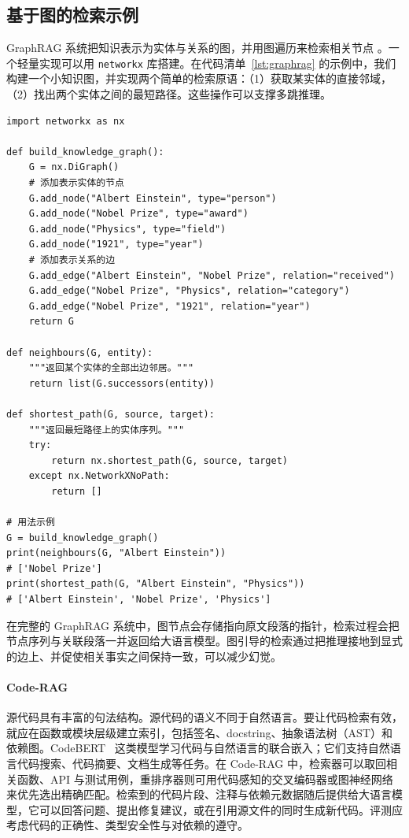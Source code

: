 \subsection{基于图的检索示例}

GraphRAG 系统把知识表示为实体与关系的图，并用图遍历来检索相关节点 \citep{peng2024graphrag_survey}。一个轻量实现可以用 \texttt{networkx} 库搭建。在代码清单~\ref{lst:graphrag} 的示例中，我们构建一个小知识图，并实现两个简单的检索原语：（1）获取某实体的直接邻域，（2）找出两个实体之间的最短路径。这些操作可以支撑多跳推理。

\begin{listing}[!ht]
\begin{verbatim}
import networkx as nx

def build_knowledge_graph():
    G = nx.DiGraph()
    # 添加表示实体的节点
    G.add_node("Albert Einstein", type="person")
    G.add_node("Nobel Prize", type="award")
    G.add_node("Physics", type="field")
    G.add_node("1921", type="year")
    # 添加表示关系的边
    G.add_edge("Albert Einstein", "Nobel Prize", relation="received")
    G.add_edge("Nobel Prize", "Physics", relation="category")
    G.add_edge("Nobel Prize", "1921", relation="year")
    return G

def neighbours(G, entity):
    """返回某个实体的全部出边邻居。"""
    return list(G.successors(entity))

def shortest_path(G, source, target):
    """返回最短路径上的实体序列。"""
    try:
        return nx.shortest_path(G, source, target)
    except nx.NetworkXNoPath:
        return []

# 用法示例
G = build_knowledge_graph()
print(neighbours(G, "Albert Einstein"))  
# ['Nobel Prize']
print(shortest_path(G, "Albert Einstein", "Physics"))  
# ['Albert Einstein', 'Nobel Prize', 'Physics']
\end{verbatim}
\caption{Python 中基于图的检索原语示例}
\label{lst:graphrag}
\end{listing}

在完整的 GraphRAG 系统中，图节点会存储指向原文段落的指针，检索过程会把节点序列与关联段落一并返回给大语言模型。图引导的检索通过把推理接地到显式的边上、并促使相关事实之间保持一致，可以减少幻觉。

\paragraph{Code-RAG}  源代码具有丰富的句法结构。源代码的语义不同于自然语言。要让代码检索有效，就应在函数或模块层级建立索引，包括签名、docstring、抽象语法树（AST）和依赖图。CodeBERT~\citep{feng2020codebert} 这类模型学习代码与自然语言的联合嵌入；它们支持自然语言代码搜索、代码摘要、文档生成等任务。在 Code-RAG 中，检索器可以取回相关函数、API 与测试用例，重排序器则可用代码感知的交叉编码器或图神经网络来优先选出精确匹配。检索到的代码片段、注释与依赖元数据随后提供给大语言模型，它可以回答问题、提出修复建议，或在引用源文件的同时生成新代码。评测应考虑代码的正确性、类型安全性与对依赖的遵守。


